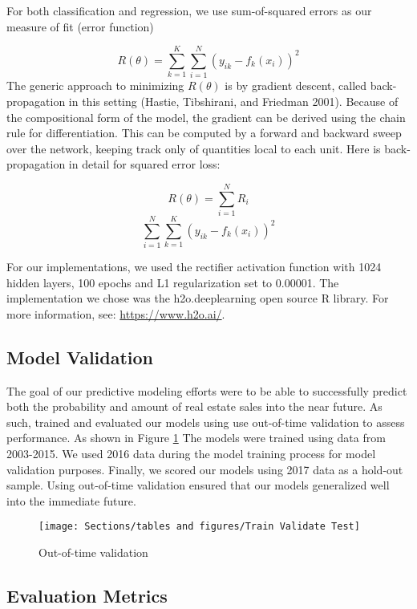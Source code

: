 \documentclass[12pt,]{article}
\begin{document}
For both classification and regression, we use sum-of-squared errors as
our measure of fit (error function)

\[
R(\theta)=\sum_{k=1}^K\sum_{i=1}^N(y_{ik}-f_{k}(x_i))^2
\] The generic approach to minimizing \(R(\theta)\) is by gradient
descent, called back-propagation in this setting (Hastie, Tibshirani,
and Friedman 2001). Because of the compositional form of the model, the
gradient can be derived using the chain rule for differentiation. This
can be computed by a forward and backward sweep over the network,
keeping track only of quantities local to each unit. Here is
back-propagation in detail for squared error loss:

\[
R(\theta) = \sum_{i=1}^NR_i
\] \[
\sum_{i=1}^N\sum_{k=1}^K(y_{ik}-f_{k}(x_i))^2
\]

For our implementations, we used the rectifier activation function with
1024 hidden layers, 100 epochs and L1 regularization set to 0.00001. The
implementation we chose was the h2o.deeplearning open source R library.
For more information, see: \url{https://www.h2o.ai/}.

\hypertarget{model-validation}{%
\subsection{Model Validation}\label{model-validation}}

The goal of our predictive modeling efforts were to be able to
successfully predict both the probability and amount of real estate
sales into the near future. As such, trained and evaluated our models
using use out-of-time validation to assess performance. As shown in
Figure \ref{fig:Train Test Validate} The models were trained using data
from 2003-2015. We used 2016 data during the model training process for
model validation purposes. Finally, we scored our models using 2017 data
as a hold-out sample. Using out-of-time validation ensured that our
models generalized well into the immediate future.

\begin{figure}[H]
\texttt{[image: Sections/tables and figures/Train Validate Test]} \caption{Out-of-time validation}\label{fig:Train Test Validate}
\end{figure}

\hypertarget{evaluation-metrics}{%
\subsection{Evaluation Metrics}\label{evaluation-metrics}}
\end{document}
